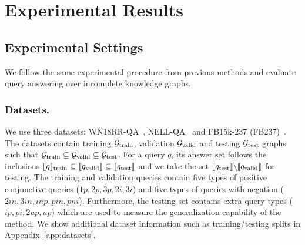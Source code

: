 \documentclass[runningheads]{llncs}
\renewcommand{\paragraph}[1]{\subsubsection{#1}}
\begin{document}
\section{Experimental Results}

\subsection{Experimental Settings}
We follow the same experimental procedure from previous methods
\cite{gqe,query2box,betae,cone} and evaluate query answering over
incomplete knowledge graphs.
\paragraph{Datasets.} We use three datasets: WN18RR-QA~\cite{line},
NELL-QA~\cite{deeppath} and FB15k-237
(FB237)~\cite{toutanova2015observed}. The datasets contain training
$\mathcal{G}_{\mbox{\scriptsize train}}$, validation
$\mathcal{G}_{\mbox{\scriptsize valid}}$ and testing
$\mathcal{G}_{\mbox{\scriptsize test}}$ graphs such that
$\mathcal{G}_{\mbox{\scriptsize train}} \subseteq
\mathcal{G}_{\mbox{\scriptsize valid}} \subseteq
\mathcal{G}_{\mbox{\scriptsize test}}$. For a query $q$, its answer
set follows the inclusions
$\llbracket q \rrbracket_{\mbox{\scriptsize train}} \subseteq
\llbracket q_{\mbox{\scriptsize valid}} \rrbracket \subseteq
\llbracket q_{\mbox{\scriptsize test}} \rrbracket $ and we take 
the set
$\llbracket q_{\mbox{\scriptsize test}} \rrbracket \backslash
\llbracket q_{\mbox{\scriptsize valid}} \rrbracket$ for testing. The
training and validation queries contain five types of positive
conjunctive queries ($1p,2p,3p,2i,3i$) and five types of queries with
negation ($2in,3in,inp,pin,pni$). Furthermore, the testing set
contains extra query types ($ip,pi,2up,up$) which are used to measure
the generalization capability of the method. We show additional
dataset information such as training/testing splits in
Appendix~\ref{app:datasets}.
\end{document}
